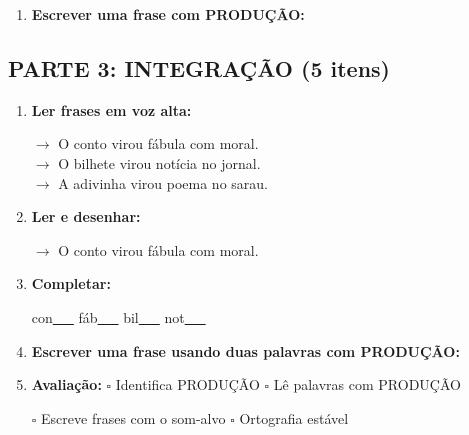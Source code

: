 \begin{exercicio}
\begin{enumerate}[resume]
  \item \textbf{Escrever uma frase com PRODUÇÃO:}
  \begin{center}
  \underline{\hspace{12cm}}
  \end{center}

\end{enumerate}

\subsection*{PARTE 3: INTEGRAÇÃO (5 itens)}

\begin{enumerate}[resume]

  \item \textbf{Ler frases em voz alta:}
  \begin{center}
  $\rightarrow$ O conto virou fábula com moral.\\
  $\rightarrow$ O bilhete virou notícia no jornal.\\
  $\rightarrow$ A adivinha virou poema no sarau.\\
  \end{center}

  \item \textbf{Ler e desenhar:}
  \begin{center}
  $\rightarrow$ O conto virou fábula com moral.
  \end{center}
  \begin{center}
  \end{center}

  \item \textbf{Completar:}
  \begin{center}
  con\underline{~~~} \quad fáb\underline{~~~} \quad bil\underline{~~~} \quad not\underline{~~~}
  \end{center}

  \item \textbf{Escrever uma frase usando duas palavras com PRODUÇÃO:}
  \begin{center}
  \underline{\hspace{12cm}}
  \end{center}

  \item \textbf{Avaliação:} $\square$ Identifica PRODUÇÃO \quad $\square$ Lê palavras com PRODUÇÃO
  \begin{center}
  $\square$ Escreve frases com o som-alvo \quad $\square$ Ortografia estável
  \end{center}


\end{enumerate}
\end{exercicio}
